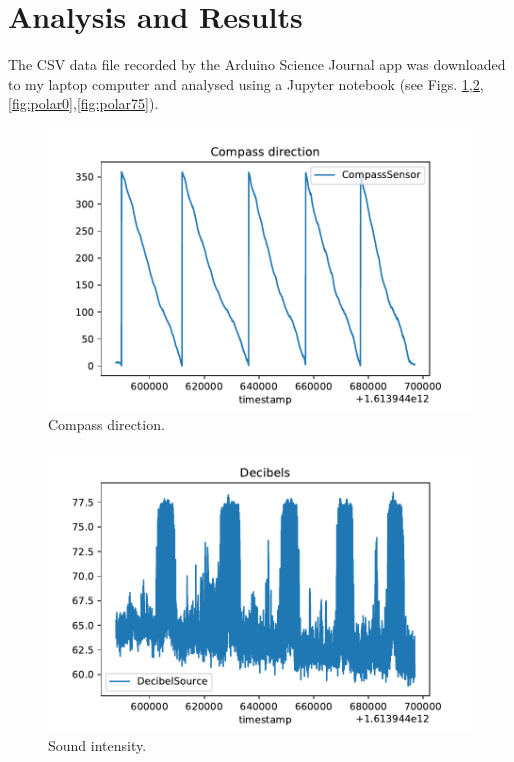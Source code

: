 \documentclass[12pt,letterpaper,english,bibliography=totocnumbered, abstract=on]{scrartcl}
\begin{document}
\section{Analysis and Results}

The CSV data file recorded by the Arduino Science Journal app was downloaded to my laptop computer and analysed using a Jupyter notebook (see Figs. \ref{fig:compass},\ref{fig:decibels},\ref{fig:polar0},\ref{fig:polar75}).

\begin{figure}[p]
	\centering
	\includegraphics[width=0.7\linewidth]{images/compass}
	\caption{Compass direction.}
	\label{fig:compass}
\end{figure}

\begin{figure}[p]
	\centering
	\includegraphics[width=0.7\linewidth]{images/decibels}
	\caption{Sound intensity.}
	\label{fig:decibels}
\end{figure}
\end{document}
